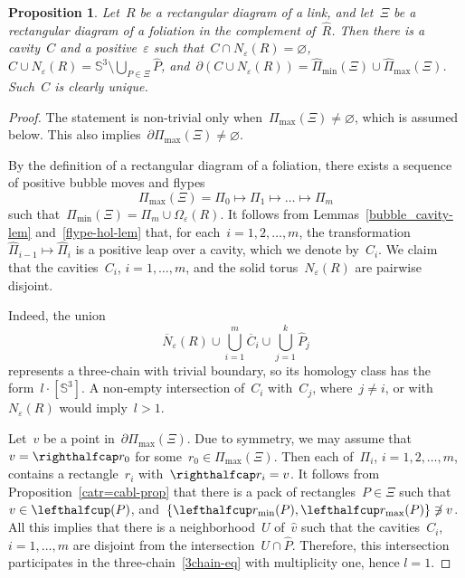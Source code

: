 \documentclass{amsart}
\def\cabl#1{\lefthalfcup#1}
\def\catr#1{\righthalfcap#1}
\theoremstyle{theorem}
\newtheorem{prop}[theo]{Proposition}
\theoremstyle{remark}
\theoremstyle{definition}
\numberwithin{equation}{section}
\numberwithin{figure}{section}
\begin{document}
\begin{prop}\label{C-N-empty-prop}
Let~$R$ be a rectangular diagram of a link, and let~$\Xi$ be a rectangular diagram of a foliation
in the complement of~$\widehat R$. Then there is a cavity~$C$ and a positive~$\varepsilon$
such that~$C\cap N_\varepsilon(R)=\varnothing$, $C\cup N_\varepsilon(R)=\mathbb S^3\setminus\bigcup_{P\in\Xi}\widehat P$, and~$\partial(C\cup N_\varepsilon(R))=\widehat\Pi_{\mathrm{min}}(\Xi)\cup\widehat\Pi_{\mathrm{max}}(\Xi)$.
Such~$C$ is clearly unique.
\end{prop}

\begin{proof}
The statement is non-trivial only when~$\Pi_{\max}(\Xi)\ne\varnothing$, which is assumed below. This also
implies~$\partial\Pi_{\max}(\Xi)\ne\varnothing$.

By the definition of a rectangular diagram of a foliation, there exists a sequence of positive bubble moves and flypes
$$\Pi_{\max}(\Xi)=\Pi_0\mapsto\Pi_1\mapsto\ldots\mapsto\Pi_m$$
such that~$\Pi_{\min}(\Xi)=\Pi_m\cup\Omega_\varepsilon(R)$.
It follows from Lemmas~\ref{bubble_cavity-lem} and~\ref{flype-hol-lem} that, for each~$i=1,2,\ldots,m$,
the transformation~$\widehat\Pi_{i-1}\mapsto\widehat\Pi_i$ is a positive leap over a cavity, which we denote by~$C_i$.
We claim that the cavities~$C_i$, $i=1,\ldots,m$, and the solid torus~$N_\varepsilon(R)$
are pairwise disjoint.

Indeed, the union
\begin{equation}\label{3chain-eq}
\overline N_\varepsilon(R)\cup\bigcup_{i=1}^m\overline C_i\cup\bigcup_{j=1}^k\widehat P_j
\end{equation}
represents a three-chain with trivial boundary, so its homology class has the form~$l\cdot[\mathbb S^3]$.
A non-empty intersection of~$C_i$ with~$C_j$, where~$j\ne i$, or with~$N_\varepsilon(R)$
would imply~$l>1$.

Let~$v$ be a point in~$\partial\Pi_{\max}(\Xi)$. Due to symmetry, we may assume that~$v=\catr r_0$
for some~$r_0\in\Pi_{\max}(\Xi)$. Then each of~$\Pi_i$, $i=1,2,\ldots,m$, contains a rectangle~$r_i$
with~$\catr r_i=v$. It follows from Proposition~\ref{catr=cabl-prop} that there is a pack of rectangles~$P\in\Xi$
such that~$v\in\cabl(P)$, and~$\{\cabl r_{\min}(P),\cabl r_{\max}(P)\}\not\ni v$. All this implies that there is a
neighborhood~$U$ of~$\widehat v$ such that the cavities~$C_i$,
$i=1,\ldots,m$ are disjoint from the intersection~$U\cap\widehat P$. Therefore, this intersection participates
in the three-chain~\eqref{3chain-eq} with multiplicity one, hence $l=1$.
\end{proof}
\end{document}
